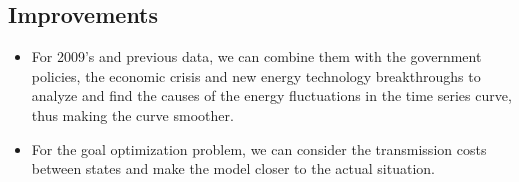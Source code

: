 \documentclass{mcmthesis}
\newcommand{\rmnum}[1]{\romannumeral #1}
\begin{document}
\subsection{Improvements}
\begin{itemize}
  \item For 2009's and previous data, we can combine them with the government policies, the economic crisis and new energy technology breakthroughs to analyze and find the causes of the energy fluctuations in the time series curve, thus making the curve smoother.
  \item For the goal optimization problem, we can consider the transmission costs between states and make the model closer to the actual situation.
\end{itemize}
\newpage
\setcounter{page}{2}
\pagestyle{fancy} 
\rhead{\small\sffamily  \rmnum{\thepage}}



\end{document}
